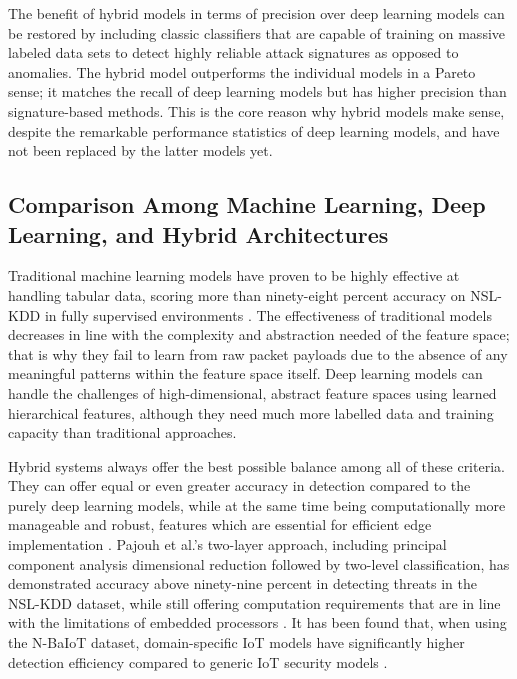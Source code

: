 \documentclass[12pt]{article}
\begin{document}
The benefit of hybrid models in terms of precision over deep learning models can be restored by including classic classifiers that are capable of training on massive labeled data sets to detect highly reliable attack signatures as opposed to anomalies. The hybrid model outperforms the individual models in a Pareto sense; it matches the recall of deep learning models but has higher precision than signature-based methods. This is the core reason why hybrid models make sense, despite the remarkable performance statistics of deep learning models, and have not been replaced by the latter models yet.

\subsection{Comparison Among Machine Learning, Deep Learning, and Hybrid Architectures}

Traditional machine learning models have proven to be highly effective at handling tabular data, scoring more than ninety-eight percent accuracy on NSL-KDD in fully supervised environments \cite{vinayakumar2019deep}. The effectiveness of traditional models decreases in line with the complexity and abstraction needed of the feature space; that is why they fail to learn from raw packet payloads due to the absence of any meaningful patterns within the feature space itself. Deep learning models can handle the challenges of high-dimensional, abstract feature spaces using learned hierarchical features, although they need much more labelled data and training capacity than traditional approaches.

Hybrid systems always offer the best possible balance among all of these criteria. They can offer equal or even greater accuracy in detection compared to the purely deep learning models, while at the same time being computationally more manageable and robust, features which are essential for efficient edge implementation \cite{hassan2020hybrid}. Pajouh et al.'s two-layer approach, including principal component analysis dimensional reduction followed by two-level classification, has demonstrated accuracy above ninety-nine percent in detecting threats in the NSL-KDD dataset, while still offering computation requirements that are in line with the limitations of embedded processors \cite{pajouh2019two}. It has been found that, when using the N-BaIoT dataset, domain-specific IoT models have significantly higher detection efficiency compared to generic IoT security models \cite{nguyen2019diot}.
\end{document}
